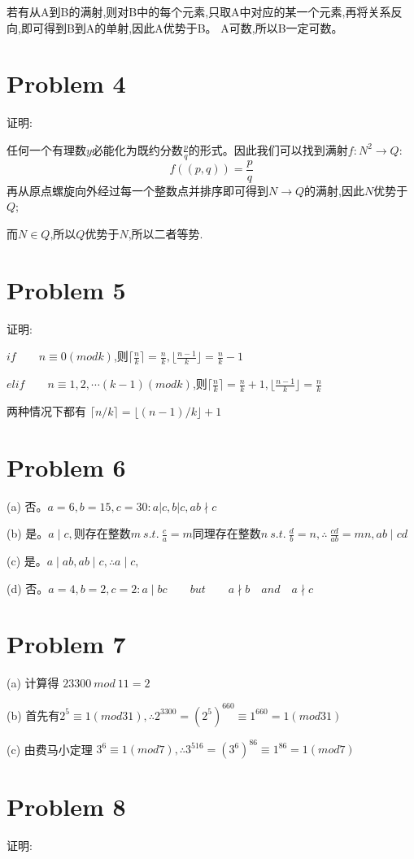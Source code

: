 \documentclass{article}
\begin{document}
若有从A到B的满射,则对B中的每个元素,只取A中对应的某一个元素,再将关系反向,即可得到B到A的单射,因此A优势于B。
A可数,所以B一定可数。

\section*{Problem 4}
证明:

任何一个有理数$y$必能化为既约分数$\frac{p}{q}$的形式。因此我们可以找到满射$f:N^{2}\rightarrow Q:$
$$
f((p,q)) = \frac{p}{q}
$$
再从原点螺旋向外经过每一个整数点并排序即可得到$N\rightarrow Q$的满射,因此$N$优势于$Q$;

而$N \in Q$,所以$Q$优势于$N$,所以二者等势.
\section*{Problem 5}
证明:

$if\qquad   n\equiv0(mod k)$,则$\lceil \frac{n}{k} \rceil = \frac{n}{k},\lfloor \frac{n-1}{k} \rfloor = \frac{n}{k} - 1$

$elif\qquad   n\equiv 1,2,\cdots (k-1)(mod k)$,则$\lceil \frac{n}{k} \rceil = \frac{n}{k}+1,\lfloor \frac{n-1}{k} \rfloor = \frac{n}{k}$

两种情况下都有 $\lceil n / k\rceil=\lfloor(n-1) / k\rfloor+1$

\section*{Problem 6}

(a) 否。$a=6,b=15,c=30:a|c,b|c,ab\nmid c$

(b) 是。$a\mid c,$则存在整数$m\ s.t.\ \frac{c}{a} = m$同理存在整数$n\ s.t.\ \frac{d}{b}=n,\therefore\ \frac{cd}{ab}=mn,ab\mid cd$

(c) 是。$a\mid ab,ab\mid c,\therefore a\mid c,$

(d) 否。$a=4,b=2,c=2:a\mid bc\qquad but\qquad a\nmid b\quad and\quad a\nmid c $

\section*{Problem 7}
(a) 计算得 $23300\ mod\ 11 = 2$

(b) 首先有$2^{5}\equiv 1(mod31),\therefore 2^{3300} = (2^{5})^{660}\equiv 1^{660} = 1(mod31)$

(c) 由费马小定理 $3^{6}\equiv 1(mod7),\therefore 3^{516} = (3^{6})^{86}\equiv 1^{86} = 1(mod7)$

\section*{Problem 8}
证明:
\end{document}
